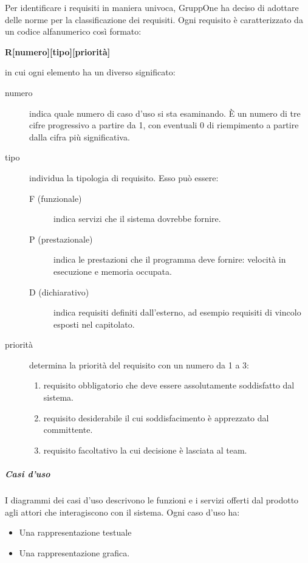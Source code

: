 \documentclass[../norme-di-progetto.tex]{subfiles}
\begin{document}
Per identificare i requisiti in maniera univoca, GruppOne ha deciso di adottare delle norme per la classificazione dei requisiti.
Ogni requisito è caratterizzato da un codice alfanumerico così formato:
\begin{center}
  \textbf{R[numero][tipo][priorità]}
\end{center}
in cui ogni elemento ha un diverso significato:
\begin{description}
  \item [numero] indica quale numero di caso d’uso si sta esaminando. È un numero di tre cifre progressivo a partire da 1, con eventuali 0 di riempimento a partire dalla cifra più significativa.
  \item [tipo] individua la tipologia di requisito. Esso può essere:
        \begin{description}
          \item [F (funzionale)] indica servizi che il sistema dovrebbe fornire.
          \item [P (prestazionale)] indica le prestazioni che il programma deve fornire: velocità in esecuzione e memoria occupata.
          \item [D (dichiarativo)] indica requisiti definiti dall'esterno, ad esempio requisiti di vincolo esposti nel capitolato.
        \end{description}
  \item [priorità] determina la priorità del requisito con un numero da 1 a 3:
        \begin{enumerate}
          \item requisito obbligatorio che deve essere assolutamente soddisfatto dal sistema.
          \item requisito desiderabile il cui soddisfacimento è apprezzato dal committente.
          \item requisito facoltativo la cui decisione è lasciata al team.
        \end{enumerate}
\end{description}

\subparagraph{Casi d'uso}%
\label{subp:casi_d'uso}
I diagrammi dei casi d'uso descrivono le funzioni e i servizi offerti dal prodotto agli attori che interagiscono con il sistema. Ogni caso d'uso ha:

\begin{itemize}
  \item Una rappresentazione testuale
  \item Una rappresentazione grafica.
\end{itemize}
\end{document}
